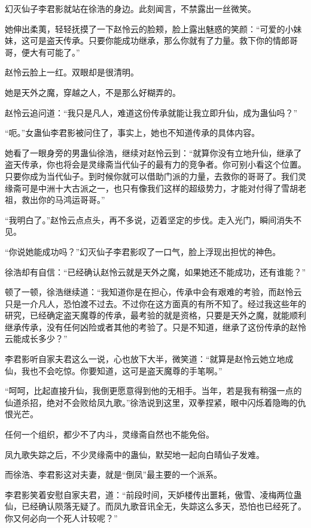 \begin{this_body}
幻灭仙子李君影就站在徐浩的身边。此刻闻言，不禁露出一丝微笑。

她伸出柔荑，轻轻抚摸了一下赵怜云的脸颊，脸上露出魅惑的笑颜：“可爱的小妹妹，这可是盗天传承。只要你能成功继承，那么你就有了力量。救下你的情郎哥哥，便大有可能了。”

赵怜云脸上一红。双眼却是很清明。

她是天外之魔，穿越之人，不是那么好糊弄的。

赵怜云追问道：“我只是凡人，难道这份传承就能让我立即升仙，成为蛊仙吗？”

“呃。”女蛊仙李君影被问住了，事实上，她也不知道传承的具体内容。

她看了一眼身旁的男蛊仙徐浩，继续对赵怜云到：“就算你没有立地升仙，继承了盗天传承，你也将会是灵缘斋当代仙子的最有力的竞争者。你可别小看这个位置。只要你成为当代仙子。到时候你就可以借助门派的力量，去救你的哥哥了。我们灵缘斋可是中洲十大古派之一，也只有像我们这样的超级势力，才能对付得了雪胡老祖，救出你的马鸿运哥哥。”

“我明白了。”赵怜云点点头，再不多说，迈着坚定的步伐。走入光门，瞬间消失不见。

“你说她能成功吗？”幻灭仙子李君影叹了一口气，脸上浮现出担忧的神色。

徐浩却有自信：“已经确认赵怜云就是天外之魔，如果她还不能成功，还有谁能？”

顿了一顿，徐浩继续道：“我知道你是在担心，传承中会有艰难的考验，而赵怜云只是一介凡人，恐怕渡不过去。不过你在这方面真的有所不知了。经过我这些年的研究，已经确定盗天魔尊的传承，最考验的就是资格，只要是天外之魔，就能顺利继承传承，没有任何凶险或者其他的考验了。只是不知道，继承了这份传承的赵怜云能成长多少？”

李君影听自家夫君这么一说，心也放下大半，微笑道：“就算是赵怜云她立地成仙，我也不会吃惊。你要知道，这可是盗天魔尊的手笔啊。”

“呵呵，比起直接升仙，我倒更愿意得到他的无相手。当年，若是我有稍强一点的仙道杀招，绝对不会败给凤九歌。”徐浩说到这里，双拳捏紧，眼中闪烁着隐晦的仇恨光芒。

任何一个组织，都少不了内斗，灵缘斋自然也不能免俗。

凤九歌失踪之后，不少灵缘斋中的蛊仙，默契地一起向白晴仙子发难。

而徐浩、李君影这对夫妻，就是“倒凤”最主要的一个派系。

李君影笑着安慰自家夫君，道：“前段时间，天妒楼传出噩耗，傲雪、凌梅两位蛊仙，已经确认陨落无疑了。而凤九歌音讯全无，失踪这么多天，恐怕也已经死了。你又何必向一个死人计较呢？”


\end{this_body}

